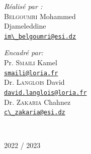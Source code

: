 {\begin{titlepage}
  \vspace{10mm}

  \noindent
  \begin{minipage}{0.6\textwidth}
    \vspace{-7mm}
    \begin{flushleft} \large
      \emph{Réalisé par :}\\
      \textsc{Belgoumri} Mohammed \\Djameleddine\\
      \href{mailto:im_belgoumri@esi.dz}{\verb!im\_belgoumri@esi.dz!}  
    \end{flushleft}
  \end{minipage}
  \begin{minipage}{0.35\textwidth}
    \begin{flushright} \large
      \begin{flushleft} \large
      \emph{Encadré par:} \\
      {
        Pr. \textsc{Smaili} Kamel\\[0.1cm]
        \href{mailto:smaili@loria.fr}{\verb!smaili@loria.fr!}\\[0.1cm]
        Dr. \textsc{Langlois} David\\[0.1cm]
        \href{mailto:david.langlois@loria.fr}{\verb!david.langlois@loria.fr!}\\[0.1cm]
        Dr. \textsc{Zakaria} Chahnez\\[0.1cm]
        \href{mailto:c_zakaria@esi.dz}{\verb!c\_zakaria@esi.dz!}\\
      }
      \end{flushleft}
    \end{flushright}
  \end{minipage}\\[1cm]

  \vfill

  {\large 2022 / 2023}        
\end{titlepage}
\restoregeometry
}